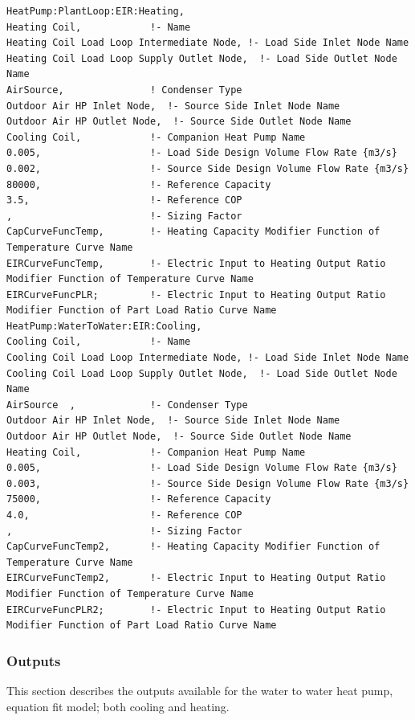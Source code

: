 \begin{lstlisting}
HeatPump:PlantLoop:EIR:Heating,
Heating Coil,            !- Name
Heating Coil Load Loop Intermediate Node, !- Load Side Inlet Node Name
Heating Coil Load Loop Supply Outlet Node,  !- Load Side Outlet Node Name
AirSource,               ! Condenser Type
Outdoor Air HP Inlet Node,  !- Source Side Inlet Node Name
Outdoor Air HP Outlet Node,  !- Source Side Outlet Node Name
Cooling Coil,            !- Companion Heat Pump Name
0.005,                   !- Load Side Design Volume Flow Rate {m3/s}
0.002,                   !- Source Side Design Volume Flow Rate {m3/s}
80000,                   !- Reference Capacity
3.5,                     !- Reference COP
,                        !- Sizing Factor
CapCurveFuncTemp,        !- Heating Capacity Modifier Function of Temperature Curve Name
EIRCurveFuncTemp,        !- Electric Input to Heating Output Ratio Modifier Function of Temperature Curve Name
EIRCurveFuncPLR;         !- Electric Input to Heating Output Ratio Modifier Function of Part Load Ratio Curve Name
HeatPump:WaterToWater:EIR:Cooling,
Cooling Coil,            !- Name
Cooling Coil Load Loop Intermediate Node, !- Load Side Inlet Node Name
Cooling Coil Load Loop Supply Outlet Node,  !- Load Side Outlet Node Name
AirSource  ,             !- Condenser Type
Outdoor Air HP Inlet Node,  !- Source Side Inlet Node Name
Outdoor Air HP Outlet Node,  !- Source Side Outlet Node Name
Heating Coil,            !- Companion Heat Pump Name
0.005,                   !- Load Side Design Volume Flow Rate {m3/s}
0.003,                   !- Source Side Design Volume Flow Rate {m3/s}
75000,                   !- Reference Capacity
4.0,                     !- Reference COP
,                        !- Sizing Factor
CapCurveFuncTemp2,       !- Heating Capacity Modifier Function of Temperature Curve Name
EIRCurveFuncTemp2,       !- Electric Input to Heating Output Ratio Modifier Function of Temperature Curve Name
EIRCurveFuncPLR2;        !- Electric Input to Heating Output Ratio Modifier Function of Part Load Ratio Curve Name
\end{lstlisting}

\subsubsection{Outputs}\label{plhp_eir_outputs}

This section describes the outputs available for the water to water heat pump, equation fit model; both cooling and heating.

